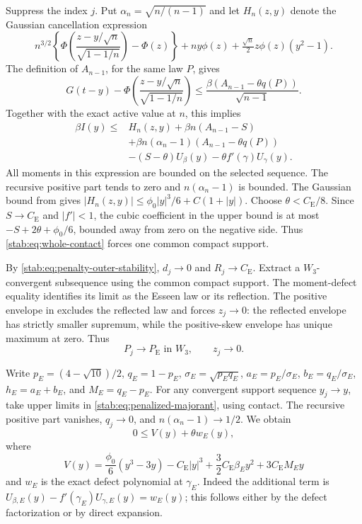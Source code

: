 \documentclass[11pt,a4paper]{article}
\numberwithin{equation}{section}
\theoremstyle{definition}
\theoremstyle{remark}
\newcommand{\CE}{C_{\mathrm E}}
\newcommand{\PE}{P_{\mathrm E}}
\begin{document}
Suppress the index $j$. Put $\alpha_n=\sqrt{n/(n-1)}$ and let
$H_n(z,y)$ denote the Gaussian cancellation expression
\[
 n^{3/2}\left\{\Phi\left(\frac{z-y/\sqrt n}{\sqrt{1-1/n}}\right)
                    -\Phi(z)\right\}
      +ny\phi(z)+\tfrac{\sqrt n}{2}z\phi(z)(y^2-1).
\]
The definition of $A_{n-1}$, for the same law $P$, gives
\[
 G(t-y)-\Phi\left(\frac{z-y/\sqrt n}{\sqrt{1-1/n}}\right)
       \le\frac{\beta(A_{n-1}-\theta q(P))}{\sqrt{n-1}}.
\]
Together with the exact active value at $n$, this implies
\begin{equation}\label{stab:eq:penalized-majorant}
 \begin{split}
 \beta I(y)\le{}&H_n(z,y)+\beta n(A_{n-1}-S)\\
   &+\beta n(\alpha_n-1)(A_{n-1}-\theta q(P))\\
   &-(S-\theta)U_\beta(y)-\theta f'(\gamma)U_\gamma(y).
 \end{split}
\end{equation}
All moments in this expression are bounded on the selected sequence.
The recursive positive part tends to zero and $n(\alpha_n-1)$
is bounded. The Gaussian bound from \cite[Lemma 4.4]{HC} gives
$|H_n(z,y)|\le\phi_0|y|^3/6+C(1+|y|)$.
Choose $\theta<\CE/8$. Since $S\to\CE$ and $|f'|<1$, the cubic
coefficient in the upper bound is at most
$-S+2\theta+\phi_0/6$, bounded away from zero on the negative side.
Thus \eqref{stab:eq:whole-contact} forces one common compact support.

By \eqref{stab:eq:penalty-outer-stability}, $d_j\to0$ and $R_j\to\CE$.
Extract a $W_3$-convergent subsequence using the common compact support.
The moment-defect equality identifies its limit as the Esseen law
or its reflection. The positive envelope in \cite[Corollary 2.4]{HC}
excludes the reflected law and forces $z_j\to0$: the reflected
envelope has strictly smaller supremum, while the positive-skew
envelope has unique maximum at zero. Thus
\[
                       P_j\to\PE\text{ in }W_3,\qquad z_j\to0.
\]

Write $p_E=(4-\sqrt{10})/2$, $q_E=1-p_E$,
$\sigma_E=\sqrt{p_Eq_E}$, $a_E=p_E/\sigma_E$,
$b_E=q_E/\sigma_E$, $h_E=a_E+b_E$, and $M_E=q_E-p_E$.
For any convergent support sequence $y_j\to y$, take upper limits
in \eqref{stab:eq:penalized-majorant}, using contact. The recursive
positive part vanishes, $q_j\to0$, and $n(\alpha_n-1)\to1/2$.
We obtain
\begin{equation}\label{stab:eq:polynomial}
                           0\le V(y)+\theta w_E(y),
\end{equation}
where
\[
 V(y)=\frac{\phi_0}{6}(y^3-3y)-\CE|y|^3
                       +\frac32\CE\beta_Ey^2+3\CE M_Ey
\]
and $w_E$ is the exact defect polynomial at $\gamma_E$.
Indeed the additional term is
$U_{\beta,E}(y)-f'(\gamma_E)U_{\gamma,E}(y)=w_E(y)$;
this follows either by the defect factorization or by direct expansion.
\end{document}
